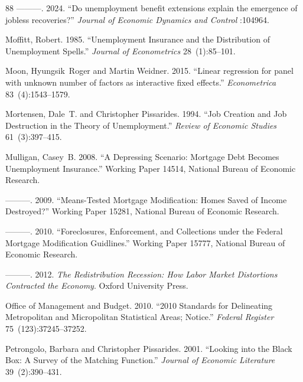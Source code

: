 \documentclass[12pt]{article}
\newcommand{\1}{\mathbf{1}}
\begin{document}
\begin{thebibliography}{88}
---{}---{}---. 2024.
\newblock \enquote{Do unemployment benefit extensions explain the emergence of jobless recoveries?}
\newblock \emph{Journal of Economic Dynamics and Control} :104964.

Moffitt, Robert. 1985.
\newblock \enquote{Unemployment Insurance and the Distribution of Unemployment Spells.}
\newblock \emph{Journal of Econometrics} 28~(1):85--101.

Moon, Hyungsik~Roger and Martin Weidner. 2015.
\newblock \enquote{Linear regression for panel with unknown number of factors as interactive fixed effects.}
\newblock \emph{Econometrica} 83~(4):1543--1579.

Mortensen, Dale~T. and Christopher Pissarides. 1994.
\newblock \enquote{Job Creation and Job Destruction in the Theory of Unemployment.}
\newblock \emph{Review of Economic Studies} 61~(3):397--415.

Mulligan, Casey~B. 2008.
\newblock \enquote{A Depressing Scenario: Mortgage Debt Becomes Unemployment Insurance.}
\newblock Working Paper 14514, National Bureau of Economic Research.

---{}---{}---. 2009.
\newblock \enquote{Means-Tested Mortgage Modification: Homes Saved of Income Destroyed?}
\newblock Working Paper 15281, National Bureau of Economic Research.

---{}---{}---. 2010.
\newblock \enquote{Foreclosures, Enforcement, and Collections under the Federal Mortgage Modification Guidlines.}
\newblock Working Paper 15777, National Bureau of Economic Research.

---{}---{}---. 2012.
\newblock \emph{The Redistribution Recession: How Labor Market Distortions Contracted the Economy}.
\newblock Oxford University Press.

{Office of Management and Budget}. 2010.
\newblock \enquote{2010 Standards for Delineating Metropolitan and Micropolitan Statistical Areas; Notice.}
\newblock \emph{Federal Register} 75~(123):37245--37252.

Petrongolo, Barbara and Christopher Pissarides. 2001.
\newblock \enquote{Looking into the Black Box: A Survey of the Matching Function.}
\newblock \emph{Journal of Economic Literature} 39~(2):390--431.


\end{thebibliography}
\end{document}
